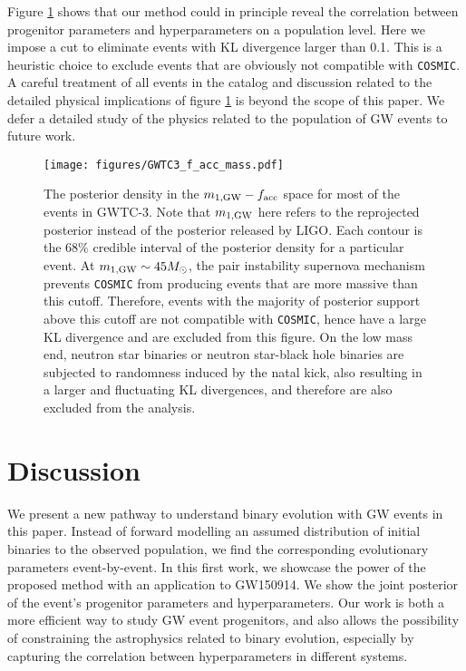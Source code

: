 \documentclass[twocolumn]{aastex631}
\begin{document}
Figure \ref{fig:GWTC-3_f_acc_mass} shows that our method could in principle
reveal the correlation between progenitor parameters and hyperparameters on a
population level. Here we impose a cut to eliminate events with KL divergence larger
than 0.1.
This is a heuristic choice to exclude events that are obviously not compatible with
\texttt{COSMIC}.
A careful treatment of all events in the catalog and
discussion related to the detailed physical implications of figure
\ref{fig:GWTC-3_f_acc_mass} is beyond the scope of this paper.  We defer a
detailed study of the physics related to the population of GW events to future
work.


\begin{figure}
\texttt{[image: figures/GWTC3\_f\_acc\_mass.pdf]}
\caption{
    The posterior density in the $m_{1,{\rm GW}}-f_{\rm acc}$ space for most of the events in GWTC-3.
    Note that $m_{1,{\rm GW}}$ here refers to the reprojected posterior instead of the posterior released by LIGO.
    Each contour is the $68\%$ credible interval of the posterior density for a particular event.
    At $m_{1,{\rm GW}} \sim 45 M_{\odot}$, the pair instability supernova mechanism prevents \texttt{COSMIC} from producing events that are more massive than this cutoff.
    Therefore, events with the majority of posterior support above this cutoff are not compatible with \texttt{COSMIC}, hence have a large KL divergence and are excluded from this figure.
    On the low mass end, neutron star binaries or neutron star-black hole binaries are subjected to randomness induced by the natal kick,
    also resulting in a larger and fluctuating KL divergences, and therefore are also excluded from the analysis.
}
\label{fig:GWTC-3_f_acc_mass}
\end{figure}

\section{Discussion}
\label{sec:discussion}


We present a new pathway to understand binary evolution with GW events in this
paper. Instead of forward modelling an assumed distribution of initial binaries
to the observed population, we find the corresponding evolutionary parameters
event-by-event. In this first work, we showcase the power of the proposed method
with an application to GW150914. We show the joint posterior of the event's
progenitor parameters and hyperparameters.  Our work is both a more efficient
way to study GW event progenitors, and also allows the possibility of
constraining the astrophysics related to binary evolution, especially by
capturing the correlation between hyperparameters in different systems.
\end{document}
